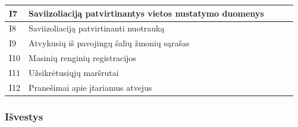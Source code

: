 \documentclass{VUMIFPSkursinis}
\begin{document}
\begin{center}
\begin{longtable}{|L{0.5cm}|L{4cm}|L{3cm}|L{3cm}|L{3cm}|}
			I7                  & Saviizoliaciją patvirtinantys vietos nustatymo duomenys     &                                                     &                                                 &                                                \\ \hline
			I8                  & Saviizoliaciją patvirtinanti nuotrauką                      &                                                     &                                                 &                                                \\ \hline
			I9                  & Atvykusių iš pavojingų šalių žmonių sąrašas                 &                                                     &                                                 &                                                \\ \hline
			I10                 & Masinių renginių registracijos                              &                                                     &                                                 &                                                \\ \hline
			I11                 & Užsikrėtusiųjų maršrutai                                    &                                                     &                                                 &                                                \\ \hline
			I12                 & Pranešimai apie įtariamus atvejus                           &                                                     &                                                 &                                                \\ \hline
	
\end{longtable}
\end{center}
\subsubsection{Išvestys}
\end{document}
